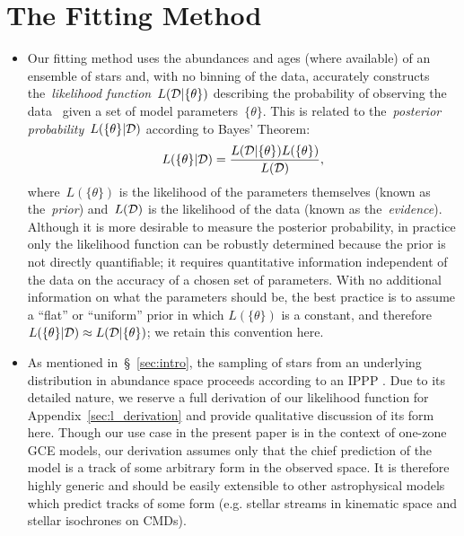 \documentclass[ms.tex]{subfiles}
\begin{document}
\section{The Fitting Method}
\label{sec:fitting}

\begin{itemize}

	\item Our fitting method uses the abundances and ages (where available) of
	an ensemble of stars and, with no binning of the data, accurately
	constructs the~\textit{likelihood function}~$L(\mathcal{D} | \{\theta\})$
	describing the probability of observing the data~ given a set of
	model parameters~$\{\theta\}$.
	This is related to the~\textit{posterior probability}~$L(\{\theta\} |
	\mathcal{D})$ according to Bayes' Theorem:
	\begin{equation}
	L(\{\theta\} | \mathcal{D}) = \frac{
		L(\mathcal{D} | \{\theta\}) L(\{\theta\})
	}{
		L(\mathcal{D})
	},
	\end{equation}
	where~$L(\{\theta\})$ is the likelihood of the parameters themselves
	(known as the~\textit{prior}) and~$L(\mathcal{D})$ is the likelihood of the
	data (known as the~\textit{evidence}).
	Although it is more desirable to measure the posterior probability,
	in practice only the likelihood function can be robustly determined
	because the prior is not directly quantifiable; it requires quantitative
	information independent of the data on the accuracy of a chosen set of
	parameters.
	With no additional information on what the parameters should be, the best
	practice is to assume a ``flat'' or ``uniform'' prior in which
	$L(\{\theta\})$ is a constant, and therefore
	$L(\{\theta\} | \mathcal{D}) \approx L(\mathcal{D} | \{\theta\})$; we retain
	this convention here.

	\item As mentioned in~\S~\ref{sec:intro}, the sampling of stars from an
	underlying distribution in abundance space proceeds according to an IPPP
	\citep[e.g.][]{Press2007}.
	Due to its detailed nature, we reserve a full derivation of our likelihood
	function for Appendix~\ref{sec:l_derivation} and provide qualitative
	discussion of its form here.
	Though our use case in the present paper is in the context of one-zone GCE
	models, our derivation assumes only that the chief prediction of the model
	is a track of some arbitrary form in the observed space.
	It is therefore highly generic and should be easily extensible to other
	astrophysical models which predict tracks of some form (e.g. stellar
	streams in kinematic space and stellar isochrones on CMDs).


\end{itemize}
\end{document}
